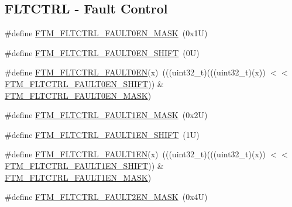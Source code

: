 \subsection*{F\+L\+T\+C\+T\+RL -\/ Fault Control}
\begin{DoxyCompactItemize}
\item 
\#define \mbox{\hyperlink{group___f_t_m___register___masks_ga55aa390cdac6997c93f7385ab41047ce}{F\+T\+M\+\_\+\+F\+L\+T\+C\+T\+R\+L\+\_\+\+F\+A\+U\+L\+T0\+E\+N\+\_\+\+M\+A\+SK}}~(0x1\+U)
\item 
\#define \mbox{\hyperlink{group___f_t_m___register___masks_gafa7b6c89e0fe43e698c029defe0c227e}{F\+T\+M\+\_\+\+F\+L\+T\+C\+T\+R\+L\+\_\+\+F\+A\+U\+L\+T0\+E\+N\+\_\+\+S\+H\+I\+FT}}~(0\+U)
\item 
\#define \mbox{\hyperlink{group___f_t_m___register___masks_gadd99b4b5d43d56b77a82663121f406ca}{F\+T\+M\+\_\+\+F\+L\+T\+C\+T\+R\+L\+\_\+\+F\+A\+U\+L\+T0\+EN}}(x)~(((uint32\+\_\+t)(((uint32\+\_\+t)(x)) $<$$<$ \mbox{\hyperlink{group___f_t_m___register___masks_gafa7b6c89e0fe43e698c029defe0c227e}{F\+T\+M\+\_\+\+F\+L\+T\+C\+T\+R\+L\+\_\+\+F\+A\+U\+L\+T0\+E\+N\+\_\+\+S\+H\+I\+FT}})) \& \mbox{\hyperlink{group___f_t_m___register___masks_ga55aa390cdac6997c93f7385ab41047ce}{F\+T\+M\+\_\+\+F\+L\+T\+C\+T\+R\+L\+\_\+\+F\+A\+U\+L\+T0\+E\+N\+\_\+\+M\+A\+SK}})
\item 
\#define \mbox{\hyperlink{group___f_t_m___register___masks_gad7d98277395370cf8e028048aa97d3c3}{F\+T\+M\+\_\+\+F\+L\+T\+C\+T\+R\+L\+\_\+\+F\+A\+U\+L\+T1\+E\+N\+\_\+\+M\+A\+SK}}~(0x2\+U)
\item 
\#define \mbox{\hyperlink{group___f_t_m___register___masks_ga35e4d4e03c8a8bc735f9a816f85665e6}{F\+T\+M\+\_\+\+F\+L\+T\+C\+T\+R\+L\+\_\+\+F\+A\+U\+L\+T1\+E\+N\+\_\+\+S\+H\+I\+FT}}~(1\+U)
\item 
\#define \mbox{\hyperlink{group___f_t_m___register___masks_gab58dc8d810f6bff6363659535e5dee0e}{F\+T\+M\+\_\+\+F\+L\+T\+C\+T\+R\+L\+\_\+\+F\+A\+U\+L\+T1\+EN}}(x)~(((uint32\+\_\+t)(((uint32\+\_\+t)(x)) $<$$<$ \mbox{\hyperlink{group___f_t_m___register___masks_ga35e4d4e03c8a8bc735f9a816f85665e6}{F\+T\+M\+\_\+\+F\+L\+T\+C\+T\+R\+L\+\_\+\+F\+A\+U\+L\+T1\+E\+N\+\_\+\+S\+H\+I\+FT}})) \& \mbox{\hyperlink{group___f_t_m___register___masks_gad7d98277395370cf8e028048aa97d3c3}{F\+T\+M\+\_\+\+F\+L\+T\+C\+T\+R\+L\+\_\+\+F\+A\+U\+L\+T1\+E\+N\+\_\+\+M\+A\+SK}})
\item 
\#define \mbox{\hyperlink{group___f_t_m___register___masks_ga1e35c0281db74fb68969c15377596ea5}{F\+T\+M\+\_\+\+F\+L\+T\+C\+T\+R\+L\+\_\+\+F\+A\+U\+L\+T2\+E\+N\+\_\+\+M\+A\+SK}}~(0x4\+U)

\end{DoxyCompactItemize}
